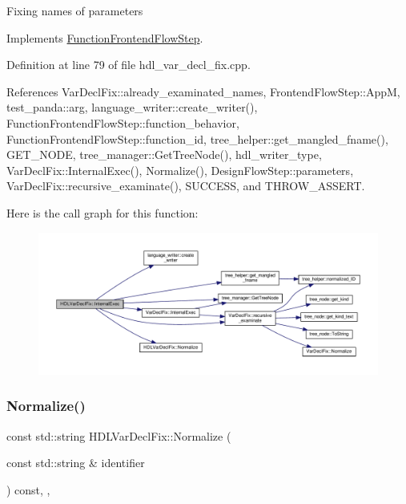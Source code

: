 Fixing names of parameters 

Implements \hyperlink{classFunctionFrontendFlowStep_a00612f7fb9eabbbc8ee7e39d34e5ac68}{Function\+Frontend\+Flow\+Step}.



Definition at line 79 of file hdl\+\_\+var\+\_\+decl\+\_\+fix.\+cpp.



References Var\+Decl\+Fix\+::already\+\_\+examinated\+\_\+names, Frontend\+Flow\+Step\+::\+AppM, test\+\_\+panda\+::arg, language\+\_\+writer\+::create\+\_\+writer(), Function\+Frontend\+Flow\+Step\+::function\+\_\+behavior, Function\+Frontend\+Flow\+Step\+::function\+\_\+id, tree\+\_\+helper\+::get\+\_\+mangled\+\_\+fname(), G\+E\+T\+\_\+\+N\+O\+DE, tree\+\_\+manager\+::\+Get\+Tree\+Node(), hdl\+\_\+writer\+\_\+type, Var\+Decl\+Fix\+::\+Internal\+Exec(), Normalize(), Design\+Flow\+Step\+::parameters, Var\+Decl\+Fix\+::recursive\+\_\+examinate(), S\+U\+C\+C\+E\+SS, and T\+H\+R\+O\+W\+\_\+\+A\+S\+S\+E\+RT.

Here is the call graph for this function\+:
\nopagebreak
\begin{figure}[H]
\begin{center}
\leavevmode
\includegraphics[width=350pt]{d8/d32/classHDLVarDeclFix_a89837edfac2c7f189baf7b0aada043da_cgraph}
\end{center}
\end{figure}
\mbox{\label{classHDLVarDeclFix_ae06ae2d02410b645529a7b03fad9f0aa}} 
\subsubsection{\texorpdfstring{Normalize()}{Normalize()}}
{\footnotesize\ttfamily const std\+::string H\+D\+L\+Var\+Decl\+Fix\+::\+Normalize (\begin{DoxyParamCaption}\item[{const std\+::string \&}]{identifier }\end{DoxyParamCaption}) const\hspace{0.3cm}{\ttfamily [override]}, {\ttfamily [protected]}, {\ttfamily [virtual]}}



